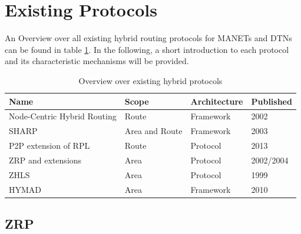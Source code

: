 \documentclass[a4paper,10pt]{scrartcl}
\begin{document}

\section{Existing Protocols}
\label{sec:existing_protocols}
An Overview over all existing hybrid routing protocols for \glspl{MANET} and \glspl{DTN}
can be found in table \ref{fig:overview}. In the following, a short introduction to each protocol and its characteristic mechanisms will be provided.

\begin{table}[t]
    \begin{tabular}{p{}|l|l|l}
        Name & Scope & Architecture & Published \\
        \hline
        Node-Centric Hybrid Routing \cite{Roy_nodecentric} & Route & Framework & 2002 \\ %
        \gls{SHARP}\cite{SHARP} & Area and Route & Framework & 2003 \\ %
        P2P extension\cite{RFC-6997} of RPL\cite{RFC-6550} & Route & Protocol & 2013\\
        \gls{ZRP} \cite{ZRP-Draft} and extensions \cite{TZRP} \cite{IZR} \cite{WARP} & Area & Protocol & 2002/2004\\
        \gls{ZHLS}\cite{ZHLS} & Area & Protocol & 1999\\
        \gls{HYMAD}\cite{HYMAD} & Area & Framework & 2010\\ %
    \end{tabular}
    \caption{Overview over existing hybrid protocols}
    \label{fig:overview}
\end{table}


\subsection{\gls{ZRP}}
\label{subsec:zrp}
\end{document}
